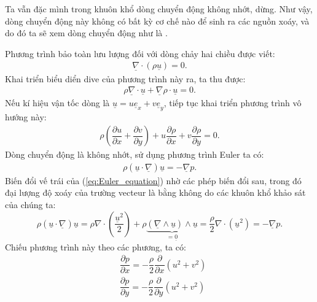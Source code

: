 \documentclass[../../DONG_CHAY_NEN_DUOC.tex]{subfiles}
\begin{document}
Ta vẫn đặc mình trong khuôn khổ dòng chuyển động không nhớt, dừng. Như vậy, dòng chuyển động này không có bất kỳ cơ chế nào để sinh ra các nguồn xoáy, và do đó ta sẽ xem dòng chuyển động như là .

Phương trình bảo toàn lưu lượng đối với dòng chảy hai chiều được viết:
	\begin{align}
		\underline{\nabla}\cdot\left(\rho\underline{u}\right)=0.
	\end{align}
Khai triển biểu diển dive của phương trình này ra, ta thu được:
 	\begin{align}
		\rho\underline{\nabla}\cdot\underline{u}+\underline{\nabla}\rho\cdot\underline{u}=0.
	\end{align}
Nếu kí hiệu vận tốc dòng là $\boxed{\underline{u}=u\underline{e}_x+ v\underline{e}_y}$, tiếp tục khai triển phương trình vô hướng này:
	\begin{align}\label{eq:Equation_conservation_explicite}
		\rho\left(\dfrac{\partial u}{\partial x}+\dfrac{\partial v}{\partial y}\right)+u\dfrac{\partial\rho}{\partial x}+v\dfrac{\partial\rho}{\partial y}=0.
	\end{align}
Dòng chuyển động là không nhớt, sử dụng phương trình Euler ta có:
	\begin{align}\label{eq:Euler_equation}
		\rho\left(\underline{u}\cdot\underline{\nabla}\right)\underline{u}=-\underline{\nabla}p.
	\end{align}
Biến đổi vế trái của (\ref{eq:Euler_equation}) nhờ các phép biến đổi sau, trong đó đại lượng độ xoáy của trường vecteur là bằng không do các khuôn khổ khảo sát của chúng ta:
	\[
		\rho\left(\underline{u}\cdot\underline{\nabla}\right)\underline{u}=\rho\nabla\cdot\left(\dfrac{\underline{u}^2}{2}\right)+\rho\underbrace{\left(\underline{\nabla}\wedge\underline{u}\right)\wedge\underline{u}}_{=\underline{0}}=\dfrac{\rho}{2}\nabla\cdot\left(\underline{u}^2\right)=-\underline{\nabla}p.
	\]
Chiếu phương trình này theo các phương, ta có:
	\begin{align}
		&\dfrac{\partial p}{\partial x}=-\dfrac{\rho}{2}\dfrac{\partial}{\partial x}\left(u^2+v^2\right)\\
		&\dfrac{\partial p}{\partial y}=-\dfrac{\rho}{2}\dfrac{\partial}{\partial y}\left(u^2+v^2\right)
	\end{align}
\end{document}
